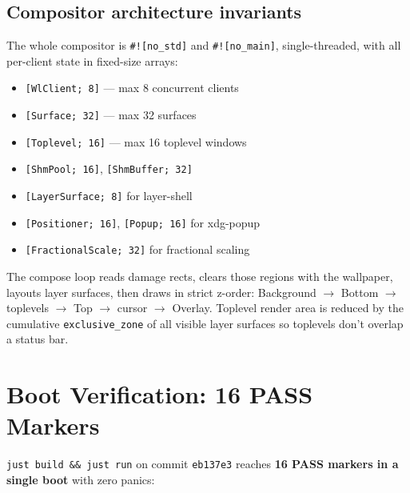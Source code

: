 \documentclass[11pt,a4paper]{article}
\begin{document}
\subsection{Compositor architecture invariants}

The whole compositor is \texttt{\#![no\_std]} and \texttt{\#![no\_main]},
single-threaded, with all per-client state in fixed-size arrays:

\begin{itemize}[leftmargin=1.4em,itemsep=0.2em]
  \item \texttt{[WlClient; 8]} --- max 8 concurrent clients
  \item \texttt{[Surface; 32]} --- max 32 surfaces
  \item \texttt{[Toplevel; 16]} --- max 16 toplevel windows
  \item \texttt{[ShmPool; 16]}, \texttt{[ShmBuffer; 32]}
  \item \texttt{[LayerSurface; 8]} for layer-shell
  \item \texttt{[Positioner; 16]}, \texttt{[Popup; 16]} for xdg-popup
  \item \texttt{[FractionalScale; 32]} for fractional scaling
\end{itemize}

The compose loop reads damage rects, clears those regions with the
wallpaper, layouts layer surfaces, then draws in strict z-order:
Background $\to$ Bottom $\to$ toplevels $\to$ Top $\to$ cursor $\to$
Overlay. Toplevel render area is reduced by the cumulative
\texttt{exclusive\_zone} of all visible layer surfaces so toplevels
don't overlap a status bar.

\section{Boot Verification: 16 PASS Markers}

\texttt{just build \&\& just run} on commit \texttt{eb137e3} reaches
\textbf{16 PASS markers in a single boot} with zero panics:
\end{document}
